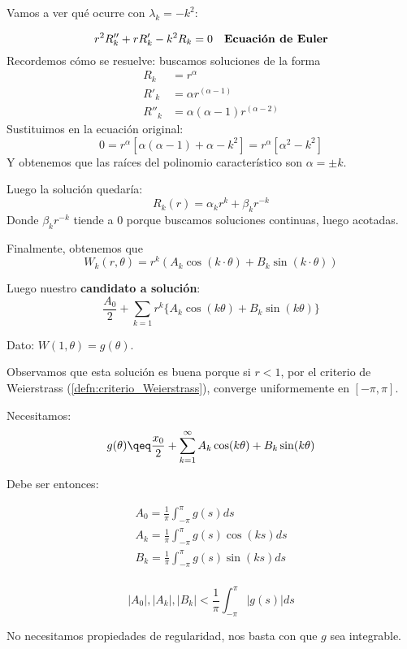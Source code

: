		Vamos a ver qué ocurre con $\lambda_k = -k^2$:

		\[r^2 R''_k + r R'_k - k^2 R_k = 0 \quad \text{\bf Ecuación de Euler}\]
		Recordemos cómo se resuelve: buscamos soluciones de la forma
		\begin{align*}
			R_k &= r^\alpha \\
			R'_k &= \alpha r^(\alpha - 1) \\
			R''_k &= \alpha(\alpha-1)r^(\alpha - 2)
		\end{align*}
		Sustituimos en la ecuación original:
		\[ 0 = r^\alpha [\alpha(\alpha -1)+ \alpha - k^2] = r^\alpha [\alpha^2 - k^2] \]
		Y obtenemos que las raíces del polinomio característico son $\alpha = ± k$.

		Luego la solución quedaría:
		\[ R_k(r) = \alpha_k r^k + \beta_k r^{-k} \]
		Donde $\beta_k r^{-k}$ tiende a 0 porque buscamos soluciones continuas, luego acotadas.

		Finalmente, obtenemos que
		$$W_k(r, \theta) = r^k (A_k \cos(k\cdot \theta) + B_k \sin(k\cdot \theta))$$

		Luego nuestro {\bf candidato a solución}:
		\[\frac{A_0}{2} + \sum_{k=1} r^k \{A_k \cos(k \theta) + B_k \sin(k\theta)\}   \]

		Dato: $W(1,\theta) = g(\theta)$.

		Observamos que esta solución es buena porque si $r<1$, por el criterio de Weierstrass (\ref{defn:criterio_Weierstrass}), converge uniformemente en $[-\pi, \pi]$.

		Necesitamos:
		\[ g(\theta) \qeq \frac{x_0}{2} + \sum_{k = 1}^{\infty} A_k \cos(k \theta) + B_k \sin(k \theta) \]

		Debe ser entonces:

		\[
		\begin{array}{l}
			A_0 = \frac{1}{\pi} \int_{-\pi}^{\pi} g(s) ds \\
			A_k = \frac{1}{\pi} \int_{-\pi}^{\pi} g(s)\cos(ks) ds \\
			B_k = \frac{1}{\pi} \int_{-\pi}^{\pi} g(s) \sin(ks) ds \\
		\end{array}
		\]

		\begin{obs}
			\[ |A_0|, |A_k|, |B_k| < \frac{1}{\pi} \int_{-\pi}^{\pi} |g(s)| ds \]

			No necesitamos propiedades de regularidad, nos basta con que $g$ sea integrable.
		\end{obs}


